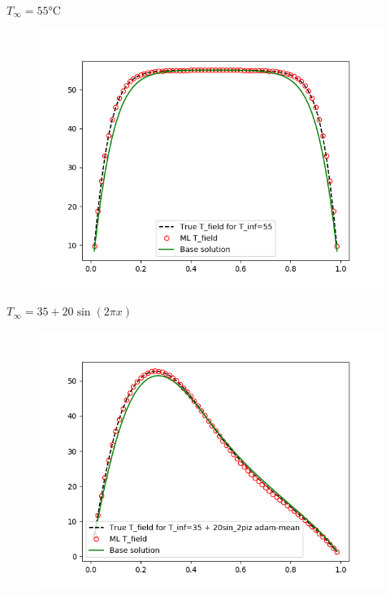 \documentclass[10pt,
			   xcolor=svgnames,
			   hyperref={linkcolor=red, citecolor = DarkGreen, colorlinks=true, urlcolor=Navy}]{beamer}
\begin{document}
\begin{frame}
$T_\infty = \ang{55}$C 
\begin{figure}[H]
	\centering	
	\includegraphics[scale=0.5]{TBeta_True_vs_TBeta_ML_N_sample_=_5_T_inf_=_55.png}
\end{figure}

\end{frame}

\begin{frame}
$T_\infty = 35 + 20\sin(2\pi x)$ 
\begin{figure}[H]
	\centering	
	\includegraphics[scale=0.5]{T_True_vs_T_ML_N_sample_5_T_inf_35_+_20sin_2piz_adam-mean.png}
\end{figure}
\end{frame}
\end{document}
